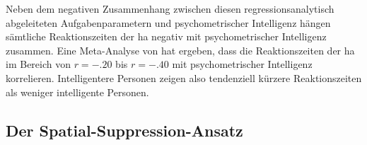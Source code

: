 \documentclass[11pt, twoside, a4paper]{book}		%
\begin{document}
Neben dem negativen Zusammenhang zwischen diesen regressionsanalytisch abgeleiteten Aufgabenparametern und psychometrischer Intelligenz hängen sämtliche  Reaktionszeiten der \gls{ha} negativ mit psychometrischer Intelligenz zusammen. Eine Meta-Analyse von \citet{Sheppard2008} hat ergeben, dass die Reaktionszeiten der \gls{ha} im Bereich von $r=-.20$ bis $r=-.40$ mit psychometrischer Intelligenz korrelieren. Intelligentere Personen zeigen also tendenziell kürzere Reaktionszeiten als weniger intelligente Personen. 









\subsection{Der Spatial-Suppression-Ansatz}
\end{document}
